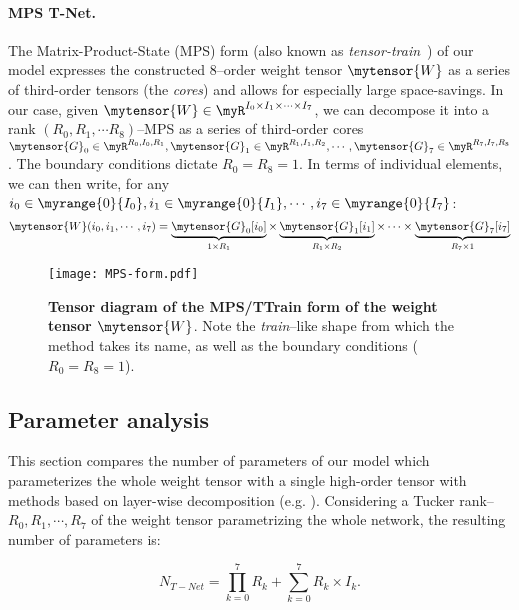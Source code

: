 \documentclass[10pt,twocolumn,letterpaper]{article}
\begin{document}
\paragraph{MPS T-Net.} The Matrix-Product-State (MPS) form (also known as \emph{tensor-train}~\cite{oseledets2011tensor}) of our model expresses the constructed 8\myth--order weight tensor \(\mytensor{W} \) as a series of third-order tensors (the \emph{cores}) and allows for especially large space-savings. In our case, given \(\mytensor{W} \in \myR^{I_0 \times I_1 \times \cdots \times I_7} \), 
we can decompose it into a rank \((R_0, R_1, \cdots R_8)\)--MPS as a series of third-order cores \(\mytensor{G}_0 \in \myR^{R_0, I_0, R_1}, \mytensor{G}_1 \in \myR^{R_1, I_1, R_2}, \cdots, \mytensor{G}_7 \in \myR^{R_7, I_7, R_8} \). The boundary conditions dictate \(R_0 = R_8 = 1\). In terms of individual elements, we can then write, for any \(i_0 \in \myrange{0}{I_0}, i_1 \in \myrange{0}{I_1}, \cdots, i_7  \in \myrange{0}{I_7}\):
\begin{equation}
    \mytensor{W}(i_0, i_1, \cdots, i_7) =
        \underbrace{\mytensor{G}_0[i_0]}_{1 \times R_1}
        \times
        \underbrace{\mytensor{G}_1[i_1]}_{R_1 \times R_2}
        \times 
        \cdots
        \times
        \underbrace{\mytensor{G}_7[i_7]}_{R_{7} \times 1} \nonumber
\end{equation}

\begin{figure}
    \centering
    \texttt{[image: MPS-form.pdf]}
    \caption{\textbf{Tensor diagram of the MPS/TTrain form of the weight tensor \(\mytensor{W}\)}. Note the \emph{train}--like shape from which the method takes its name, as well as the boundary conditions (\(R_0 = R_8 = 1\)).}
    \label{fig:mps-form}
\end{figure}

\subsection{Parameter analysis}

This section compares the number of parameters of our model which parameterizes the whole weight tensor with a single high-order tensor with methods based on layer-wise decomposition (e.g. \cite{yong2015compression, lebedev2014speeding}). Considering a Tucker rank--\(R_0, R_1, \cdots, R_7\) of the weight tensor parametrizing the whole network, the resulting number of parameters is:

\begin{equation}
N_{T-Net} = \prod_{k=0}^7 R_k + \sum_{k=0}^7 R_k \times I_k.
\end{equation}
\end{document}
